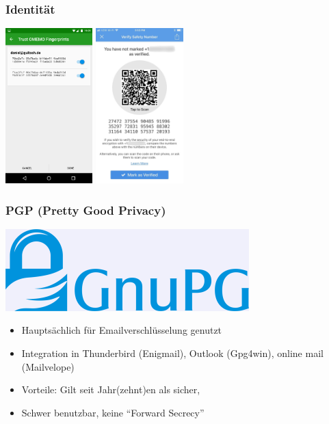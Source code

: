 \begin{frame}
  \frametitle{Identität}
    \begin{center}
      \includegraphics[height=6cm]{../../img/conversations-identity.jpg}
      \vspace{2cm}
      \includegraphics[height=6cm]{../../img/signal-identity.jpg}
    \end{center}
\end{frame}

\begin{frame}
  \frametitle{PGP (Pretty Good Privacy)}
  \begin{center}
    \includegraphics[height=0.1\textheight]{../../img/gpg.png}
  \end{center}
  \begin{itemize}
    \item<2->Hauptsächlich für Emailverschlüsselung genutzt
    \item<3->Integration in Thunderbird (Enigmail), Outlook (Gpg4win), online mail (Mailvelope)
    \item<4->Vorteile: Gilt seit Jahr(zehnt)en als sicher, 
    \item<5->Schwer benutzbar, keine ``Forward Secrecy''
  \end{itemize}
\end{frame}

